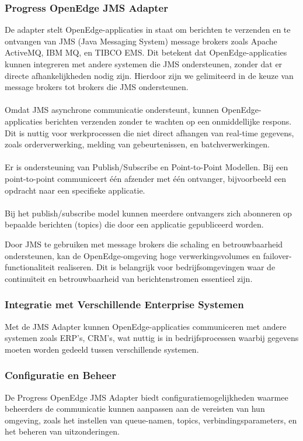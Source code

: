 \subsubsection{Progress OpenEdge JMS Adapter}
De adapter stelt OpenEdge-applicaties in staat om berichten te verzenden en te ontvangen van JMS (Java Messaging System)
message brokers zoals Apache ActiveMQ, IBM MQ, en TIBCO EMS. 
Dit betekent dat OpenEdge-applicaties kunnen integreren met andere systemen die JMS ondersteunen, 
zonder dat er directe afhankelijkheden nodig zijn.
Hierdoor zijn we gelimiteerd in de keuze van message brokers tot brokers die JMS ondersteunen.
\\
\\
Omdat JMS asynchrone communicatie ondersteunt, kunnen OpenEdge-applicaties berichten verzenden zonder te wachten op een onmiddellijke respons.
Dit is nuttig voor werkprocessen die niet direct afhangen van real-time gegevens, zoals orderverwerking, 
melding van gebeurtenissen, en batchverwerkingen.
\\\\
Er is ondersteuning van Publish/Subscribe en Point-to-Point Modellen.
Bij een point-to-point communiceert één afzender met één ontvanger, bijvoorbeeld een opdracht naar een specifieke applicatie.
\\\\
Bij het publish/subscribe model kunnen meerdere ontvangers zich abonneren op bepaalde berichten (topics) die door een applicatie gepubliceerd worden.

Door JMS te gebruiken met message brokers die schaling en betrouwbaarheid ondersteunen, kan de OpenEdge-omgeving hoge verwerkingsvolumes en failover-functionaliteit realiseren. 
Dit is belangrijk voor bedrijfsomgevingen waar de continuïteit en betrouwbaarheid van berichtenstromen essentieel zijn.

\subsubsection{Integratie met Verschillende Enterprise Systemen}
Met de JMS Adapter kunnen OpenEdge-applicaties communiceren met andere systemen zoals ERP's, CRM’s, wat nuttig is in bedrijfsprocessen waarbij 
gegevens moeten worden gedeeld tussen verschillende systemen.

\subsubsection{Configuratie en Beheer}
De Progress OpenEdge JMS Adapter biedt configuratiemogelijkheden waarmee beheerders de communicatie kunnen aanpassen aan de vereisten van hun omgeving, 
zoals het instellen van queue-namen, topics, verbindingsparameters, en het beheren van uitzonderingen.

